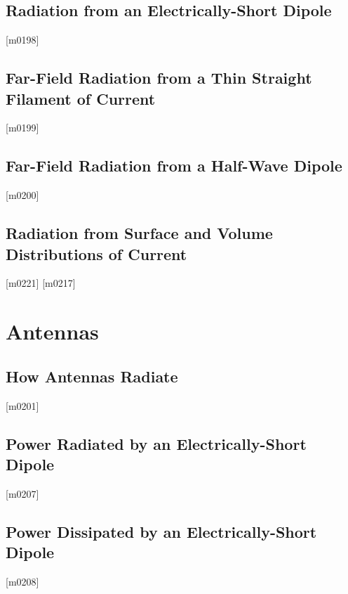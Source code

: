 \documentclass[10pt,letterpaper,twocolumn,openany]{book}
\theoremstyle{definition} %
\begin{document}
    \section{Radiation from an Electrically-Short Dipole}
{\color{blue}\tiny[m0198]}      
      \vfill\break
    \section{Far-Field Radiation from a Thin Straight Filament of Current}
{\color{blue}\tiny[m0199]}      
      \vfill\break
    \section{Far-Field Radiation from a Half-Wave Dipole}
{\color{blue}\tiny[m0200]}      
      \vfill\break
    \section{Radiation from Surface and Volume Distributions of Current}
{\color{blue}\tiny[m0221]}      
{\color{blue}\tiny[m0217]}    
  \chapter{Antennas}
  \thispagestyle{fancy} %
  \fancyhf{}            %
    \section{How Antennas Radiate}
{\color{blue}\tiny[m0201]}      
      \vfill\break
    \section{Power Radiated by an Electrically-Short Dipole}
{\color{blue}\tiny[m0207]}      
      \vfill\break
    \section{Power Dissipated by an Electrically-Short Dipole}
{\color{blue}\tiny[m0208]}      
      \vfill\break
\end{document}
